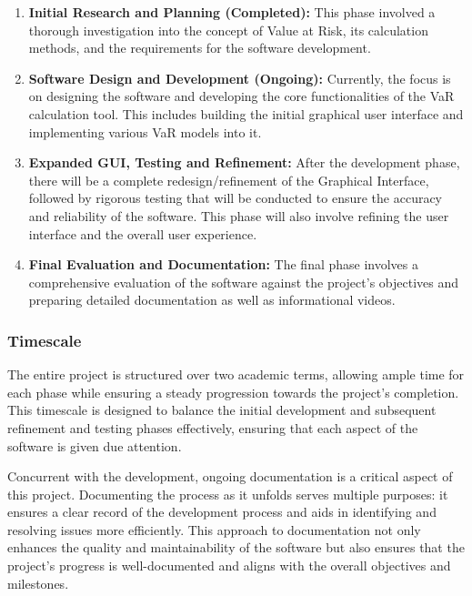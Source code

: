 \documentclass{article}
\begin{document}
  \begin{enumerate}
    \item \textbf{Initial Research and Planning (Completed):} This phase involved a thorough investigation into the concept of Value at Risk, its calculation methods, and the requirements for the software development.
    \item \textbf{Software Design and Development (Ongoing):} Currently, the focus is on designing the software and developing the core functionalities of the VaR calculation tool. This includes building the initial graphical user interface and implementing various VaR models into it.
    \item \textbf{Expanded GUI, Testing and Refinement:} After the development phase, there will be a complete redesign/refinement of the Graphical Interface, followed by rigorous testing that will be conducted to ensure the accuracy and reliability of the software. This phase will also involve refining the user interface and the overall user experience.
    \item \textbf{Final Evaluation and Documentation:} The final phase involves a comprehensive evaluation of the software against the project's objectives and preparing detailed documentation as well as informational videos.
  \end{enumerate}

  \subsubsection{Timescale}
  The entire project is structured over two academic terms, allowing ample time for each phase while ensuring a steady progression towards the project's completion. This timescale is designed to balance the initial development and subsequent refinement and testing phases effectively, ensuring that each aspect of the software is given due attention.\\\vspace{0.3cm}

  Concurrent with the development, ongoing documentation is a critical aspect of this project. Documenting the process as it unfolds serves multiple purposes: it ensures a clear record of the development process and aids in identifying and resolving issues more efficiently. This approach to documentation not only enhances the quality and maintainability of the software but also ensures that the project's progress is well-documented and aligns with the overall objectives and milestones.
\end{document}
